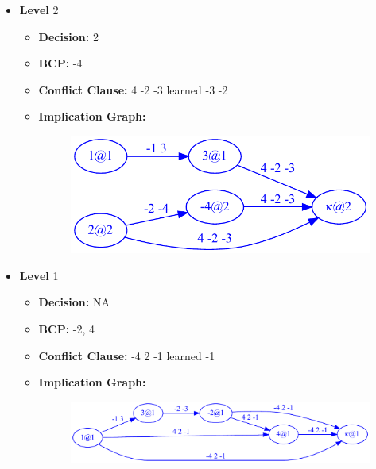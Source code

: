 \documentclass{article}
\newenvironment{solution}{\color{blue} \em }{}
\begin{document}
\begin{enumerate}
\begin{solution}
\begin{itemize}
\item \textbf{Level} 2
\begin{itemize}
	\item \textbf{Decision:} 2
	\item \textbf{BCP:} -4
	\item \textbf{Conflict Clause:} 4 -2 -3 learned -3 -2
	\item \textbf{Implication Graph:}
	\begin{figure}[h!]
		\begin{center}
			\includegraphics[scale=0.75]{sat-images/graph2}
		\end{center}
	\end{figure}
\end{itemize}

\item \textbf{Level} 1
\begin{itemize}
	\item \textbf{Decision:} NA
	\item \textbf{BCP:} -2, 4
	\item \textbf{Conflict Clause:} -4 2 -1 learned -1
	\item \textbf{Implication Graph:}
	\begin{figure}[h!]
		\begin{center}
			\includegraphics[scale=0.75]{sat-images/graph3}
		\end{center}
	\end{figure}
\end{itemize}


\end{itemize}
\end{solution}
\end{enumerate}
\end{document}
